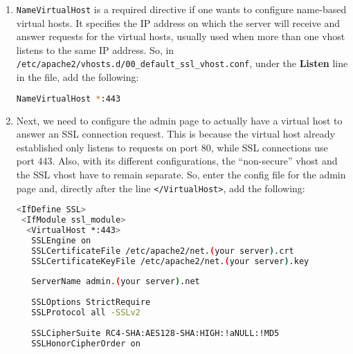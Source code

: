 \documentclass[11pt]{article}
\begin{document}
\begin {itemize}
\begin{enumerate}
    \item \verb|NameVirtualHost| is a required directive if one wants to configure name-based virtual hosts. It specifies the IP address on which the server will receive and answer requests for the virtual hosts, usually used when more than one vhost listens to the same IP address. So, in \verb|/etc/apache2/vhosts.d/00_default_ssl_vhost.conf|, under the \textbf{Listen} line in the file, add the following:
    \begin{lstlisting}[basicstyle=\ttfamily, backgroundcolor = \color{lightgray}, language = bash, xleftmargin = 0cm, framexleftmargin = 1em, framexrightmargin = 6em, showstringspaces=false] 
NameVirtualHost *:443
\end{lstlisting}

    \item Next, we need to configure the admin page to actually have a virtual host to answer an SSL connection request. This is because the virtual host already established only listens to requests on port 80, while SSL connections use port 443. Also, with its different configurations, the ``non-secure'' vhost and the SSL vhost have to remain separate. So, enter the config file for the admin page and, directly after the line \verb|</VirtualHost>|, add the following:
    \begin{lstlisting}[basicstyle=\ttfamily, backgroundcolor = \color{lightgray}, language = bash, xleftmargin = 0cm, framexleftmargin = 1em, framexrightmargin = 8em, showstringspaces=false] 
<IfDefine SSL>
 <IfModule ssl_module>
  <VirtualHost *:443>
   SSLEngine on
   SSLCertificateFile /etc/apache2/net.(your server).crt
   SSLCertificateKeyFile /etc/apache2/net.(your server).key
   
   ServerName admin.(your server).net
   
   SSLOptions StrictRequire
   SSLProtocol all -SSLv2
   
   SSLCipherSuite RC4-SHA:AES128-SHA:HIGH:!aNULL:!MD5
   SSLHonorCipherOrder on
   

\end{lstlisting}
\end{enumerate}
\end{itemize}
\end{document}
